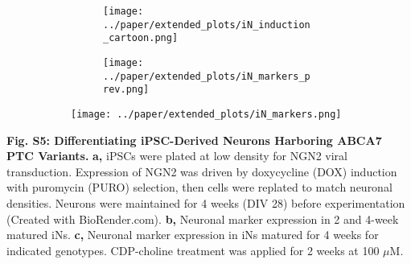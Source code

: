 \begin{figure}[H]
    \begin{subfigure}[t]{\textwidth}
        \begin{subfigure}[t]{0.45\textwidth}
            \caption{}
            \texttt{[image: ../paper/extended\_plots/iN\_induction\_cartoon.png]}        
        \end{subfigure}
        \begin{subfigure}[t]{0.45\textwidth}
            \caption{}
            \texttt{[image: ../paper/extended\_plots/iN\_markers\_prev.png]}        
        \end{subfigure}
    \end{subfigure}
    \begin{subfigure}[t]{0.8\textwidth}
        \caption{}
        \hspace{2cm}
        \texttt{[image: ../paper/extended\_plots/iN\_markers.png]}        
    \end{subfigure}
\end{figure}
\textbf{Fig. S5: Differentiating iPSC-Derived Neurons Harboring ABCA7 PTC Variants.}
\textbf{a,} iPSCs were plated at low density for NGN2 viral transduction. Expression of NGN2 was driven by doxycycline (DOX) induction with puromycin (PURO) selection, then cells were replated to match neuronal densities. Neurons were maintained for 4 weeks (DIV 28) before experimentation (Created with BioRender.com). 
\textbf{b,} Neuronal marker expression in 2 and 4-week matured iNs. 
\textbf{c,} Neuronal marker expression in iNs matured for 4 weeks for indicated genotypes. CDP-choline treatment was applied for 2 weeks at 100 $\mu$M.